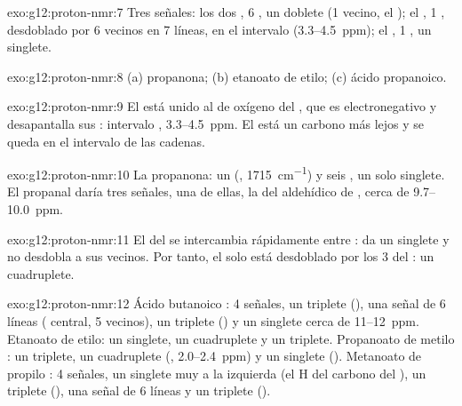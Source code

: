 \begin{solution}{exo:g12:proton-nmr:7}
Tres señales: los dos , 6 , un doblete (1
vecino, el ); el , 1 , desdoblado por 6 vecinos en
7 líneas, en el intervalo  (3.3--\qty{4.5}{ppm}); el
, 1 , un singlete.
\end{solution}

\begin{solution}{exo:g12:proton-nmr:8}
(a) propanona; (b) etanoato de etilo; (c) ácido propanoico.
\end{solution}

\begin{solution}{exo:g12:proton-nmr:9}
El  está unido al  de oxígeno del , que es
electronegativo y desapantalla sus : intervalo ,
3.3--\qty{4.5}{ppm}. El  está un carbono más lejos y se queda en
el intervalo de las cadenas.
\end{solution}

\begin{solution}{exo:g12:proton-nmr:10}
La propanona: un  (, \qty{1715}{cm^{-1}}) y seis , un solo singlete. El propanal daría tres señales, una de
ellas, la del  aldehídico de , cerca de 9.7--\qty{10.0}{ppm}.
\end{solution}

\begin{solution}{exo:g12:proton-nmr:11}
El  del  se intercambia rápidamente entre : da un
singlete y no desdobla a sus vecinos. Por tanto, el  solo está
desdoblado por los 3  del : un cuadruplete.
\end{solution}

\begin{solution}{exo:g12:proton-nmr:12}
Ácido butanoico : 4 señales, un triplete (),
una señal de 6 líneas ( central, 5 vecinos), un triplete
() y un singlete cerca de 11--\qty{12}{ppm}. Etanoato de
etilo: un singlete, un cuadruplete y un triplete. Propanoato de metilo
: un triplete, un cuadruplete (,
2.0--\qty{2.4}{ppm}) y un singlete (). Metanoato de propilo
: 4 señales, un singlete muy a la izquierda (el H
del carbono del ), un triplete (), una señal de 6
líneas y un triplete ().
\end{solution}

